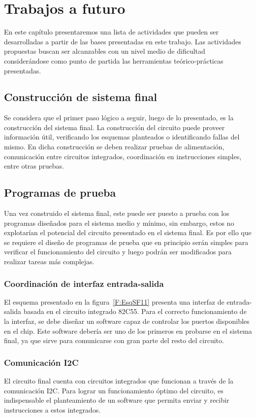 \chapter{Trabajos a futuro}
\label{C:trabajos_a_futuro}

En este capítulo presentaremos una lista de actividades que pueden ser desarrolladas a partir de las bases presentadas en este trabajo. Las actividades propuestas buscan ser alcanzables con un nivel medio de dificultad considerándose como punto de partida las herramientas teórico-prácticas presentadas.

\section{Construcción de sistema final}
Se considera que el primer paso lógico a seguir, luego de lo presentado, es la construcción del sistema final. La construcción del circuito puede proveer información útil, verificando los esquemas planteados o identificando fallas del mismo. En dicha construcción se deben realizar pruebas de alimentación, comunicación entre circuitos integrados, coordinación en instrucciones simples, entre otras pruebas.


\section{Programas de prueba}
Una vez construido el sistema final, este puede ser puesto a prueba con los programas diseñados para el sistema medio y mínimo, sin embargo, estos no explotarían el potencial del circuito presentado en el sistema final. Es por ello que se requiere el diseño de programas de prueba que en principio serán simples para verificar el funcionamiento del circuito y luego podrán ser modificados para realizar tareas más complejas. 

\subsection{Coordinación de interfaz entrada-salida}
El esquema presentado en la figura~\ref{F:EsqSF11} presenta una interfaz de entrada-salida basada en el circuito integrado 82C55. Para el correcto funcionamiento de la interfaz, se debe diseñar un software capaz de controlar los puertos disponibles en el chip. Este software debería ser uno de los primeros en probarse en el sistema final, ya que sirve para comunicarse con gran parte del resto del circuito. 

\subsection{Comunicación I2C}
El circuito final cuenta con circuitos integrados que funcionan a través de la comunicación I2C. Para lograr un funcionamiento óptimo del circuito, es indispensable el planteamiento de un software que permita enviar y recibir instrucciones a estos integrados. 

